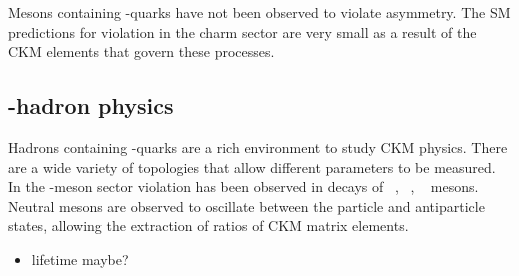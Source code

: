 Mesons containing \cquark-quarks have not been observed to violate \CP asymmetry. The SM predictions for \CP violation in the charm sector are very small as a result of the CKM elements that govern these processes.     


\subsection{\bquark-hadron physics}
Hadrons containing \bquark-quarks are a rich environment to study CKM physics. 
There are a wide variety of topologies that allow different parameters to be measured. 
In the \bquark-meson sector \CP violation has been observed in decays of \Bp~\cite{PhysRevD.82.072004,PhysRevD.81.112002}, \Bz~\cite{PhysRevLett.87.091801,PhysRevLett.87.091802}, \Bs~\cite{PhysRevLett.110.221601} mesons.
Neutral \B mesons are observed to oscillate between the particle and antiparticle states, allowing the extraction of ratios of CKM matrix elements.


{\color{Red}
\begin{itemize}
\item lifetime maybe? 
\end{itemize}}




